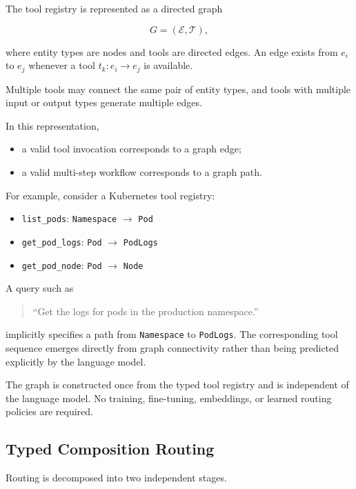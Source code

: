 The tool registry is represented as a directed graph

\[
G=(\mathcal{E},\mathcal{T}),
\]

where entity types are nodes and tools are directed edges.
An edge exists from $e_i$ to $e_j$ whenever a tool
$t_k:e_i\rightarrow e_j$
is available.

Multiple tools may connect the same pair of entity types, and tools with multiple input or output types generate multiple edges.

In this representation,

\begin{itemize}
\item a valid tool invocation corresponds to a graph edge;
\item a valid multi-step workflow corresponds to a graph path.
\end{itemize}

For example, consider a Kubernetes tool registry:

\begin{itemize}
    \item \texttt{list\_pods}: \texttt{Namespace} $\rightarrow$ \texttt{Pod}
    \item \texttt{get\_pod\_logs}: \texttt{Pod} $\rightarrow$ \texttt{PodLogs}
    \item \texttt{get\_pod\_node}: \texttt{Pod} $\rightarrow$ \texttt{Node}
\end{itemize}

A query such as

\begin{quote}
``Get the logs for pods in the production namespace.''
\end{quote}

implicitly specifies a path from
\texttt{Namespace}
to
\texttt{PodLogs}.
The corresponding tool sequence emerges directly from graph connectivity rather than being predicted explicitly by the language model.

The graph is constructed once from the typed tool registry and is independent of the language model.
No training, fine-tuning, embeddings, or learned routing policies are required.

\subsection{Typed Composition Routing}
\label{sec:tcr}

Routing is decomposed into two independent stages.

